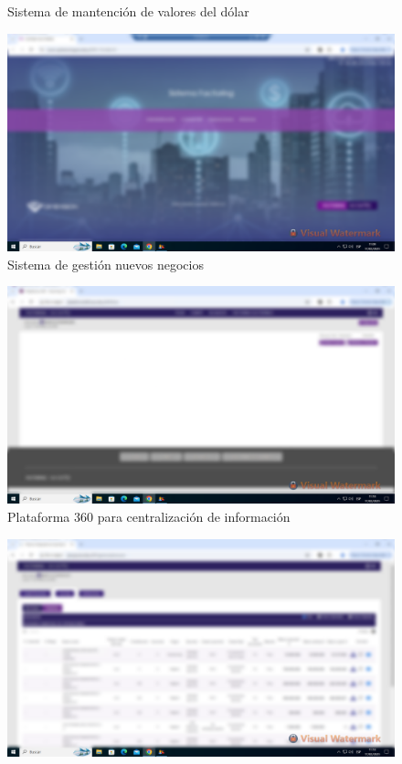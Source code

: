 \documentclass[12pt,a4paper]{report}
\begin{document}
\begin{itemize}
\begin{figure}[H]
      \caption{Sistema de mantención de valores del dólar}
    \end{figure}
    \begin{figure}[H]
      \centering
      \includegraphics[width=14cm]{images/pantallas/nuevo-curse.png}
      \caption{Sistema de gestión nuevos negocios}
    \end{figure}
    \begin{figure}[H]
      \centering
      \includegraphics[width=14cm]{images/pantallas/p360.png}
      \caption{Plataforma 360 para centralización de información}
    \end{figure}
    \begin{figure}[H]
      \centering
      \includegraphics[width=14cm]{images/pantallas/pia.png}

\end{figure}
\end{itemize}
\end{document}
